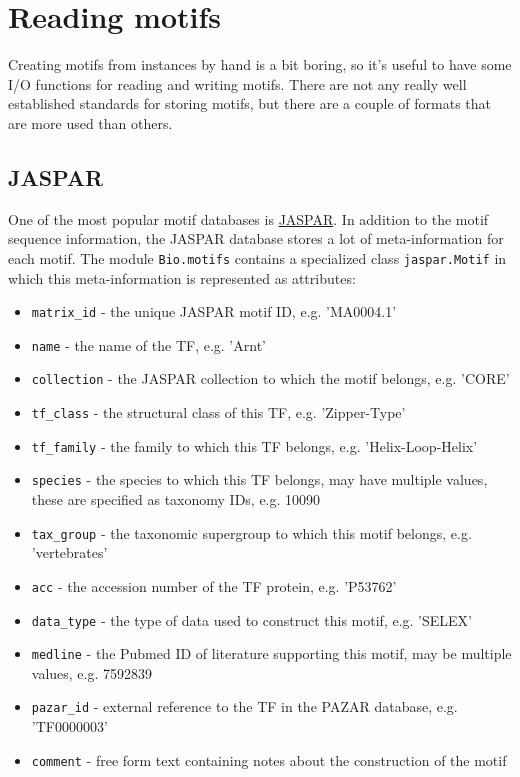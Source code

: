\section{Reading motifs}
\label{sec:io}

Creating motifs from instances by hand is a bit boring, so it's
useful to have some I/O functions for reading and writing
motifs. There are not any really well established standards for storing
motifs, but there are a couple of formats that are more used than
others.

\subsection{JASPAR}
One of the most popular motif databases is \href{http://jaspar.genereg.net}{JASPAR}. In addition to the motif sequence information, the JASPAR database stores a lot of meta-information for each motif. The module \verb+Bio.motifs+ contains a specialized class \verb+jaspar.Motif+ in which this meta-information is represented as attributes:
\begin{itemize}
    \item \verb+matrix_id+ - the unique JASPAR motif ID, e.g. 'MA0004.1'
    \item \verb+name+ - the name of the TF, e.g. 'Arnt'
    \item \verb+collection+ - the JASPAR collection to which the motif belongs, e.g. 'CORE'
    \item \verb+tf_class+ - the structural class of this TF, e.g. 'Zipper-Type'
    \item \verb+tf_family+ - the family to which this TF belongs, e.g. 'Helix-Loop-Helix'
    \item \verb+species+ - the species to which this TF belongs, may have multiple values, these are specified as taxonomy IDs, e.g. 10090
    \item \verb+tax_group+ - the taxonomic supergroup to which this motif belongs, e.g. 'vertebrates'
    \item \verb+acc+ - the accession number of the TF protein, e.g. 'P53762'
    \item \verb+data_type+ - the type of data used to construct this motif, e.g. 'SELEX'
    \item \verb+medline+ - the Pubmed ID of literature supporting this motif, may be multiple values, e.g. 7592839
    \item \verb+pazar_id+ - external reference to the TF in the PAZAR database, e.g. 'TF0000003'
    \item \verb+comment+ - free form text containing notes about the construction of the motif
\end{itemize}

